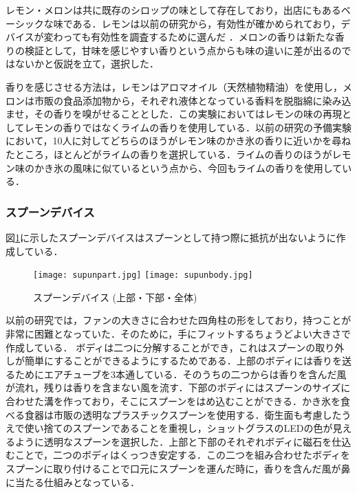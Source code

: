 レモン・メロンは共に既存のシロップの味として存在しており，出店にもあるベーシックな味である．レモンは以前の研究から，有効性が確かめられており，デバイスが変わっても有効性を調査するために選んだ
．メロンの香りは新たな香りの検証として，甘味を感じやすい香りという点からも味の違いに差が出るのではないかと仮説を立て，選択した．

香りを感じさせる方法は，レモンはアロマオイル（天然植物精油）を使用し，メロンは市販の食品添加物から，それぞれ液体となっている香料を脱脂綿に染み込ませ，その香りを嗅がせることとした．この実験においてはレモンの味の再現としてレモンの香りではなくライムの香りを使用している．以前の研究の予備実験において，10人に対してどちらのほうがレモン味のかき氷の香りに近いかを尋ねたところ，ほとんどがライムの香りを選択している．ライムの香りのほうがレモン味のかき氷の風味に似ているという点から、今回もライムの香りを使用している．

\subsubsection{スプーンデバイス}
図\ref{device}に示したスプーンデバイスはスプーンとして持つ際に抵抗が出ないように作成している．
\begin{figure}[t]
  \texttt{[image: supunpart.jpg]}
  \texttt{[image: supunbody.jpg]}
  \caption{スプーンデバイス
  (上部・下部・全体)}
  \label{device}
\end{figure}
以前の研究では，ファンの大きさに合わせた四角柱の形をしており，持つことが非常に困難となっていた．そのために，手にフィットするちょうどよい大きさで作成している．
ボディは二つに分解することができ，これはスプーンの取り外しが簡単にすることができるようにするためである．上部のボディには香りを送るためにエアチューブを3本通している．そのうちの二つからは香りを含んだ風が流れ，残りは香りを含まない風を流す．下部のボディにはスプーンのサイズに合わせた溝を作っており，そこにスプーンをはめ込むことができる．かき氷を食べる食器は市販の透明なプラスチックスプーンを使用する．衛生面も考慮したうえで使い捨てのスプーンであることを重視し，ショットグラスのLEDの色が見えるように透明なスプーンを選択した．上部と下部のそれぞれボディに磁石を仕込むことで，二つのボディはくっつき安定する．この二つを組み合わせたボディをスプーンに取り付けることで口元にスプーンを運んだ時に，香りを含んだ風が鼻に当たる仕組みとなっている．





